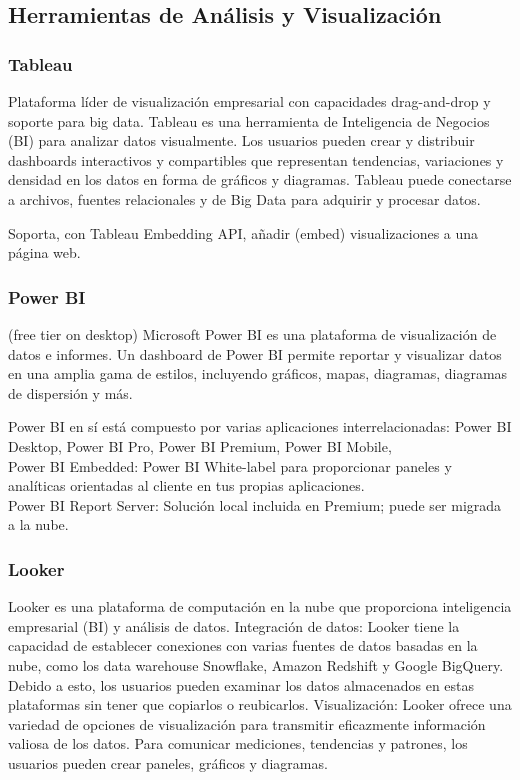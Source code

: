 \documentclass[12pt]{book}
\begin{document}
\subsection{Herramientas de Análisis y Visualización}

\subsubsection{Tableau}
Plataforma líder de visualización empresarial con capacidades drag-and-drop y soporte para big data.
Tableau es una herramienta de Inteligencia de Negocios (BI) para analizar datos visualmente. Los usuarios 
pueden crear y distribuir dashboards interactivos y compartibles que representan tendencias, 
variaciones y densidad en los datos en forma de gráficos y diagramas. Tableau puede conectarse a 
archivos, fuentes relacionales y de Big Data para adquirir y procesar datos.

Soporta, con Tableau Embedding API, añadir (embed) visualizaciones a una página web.


\subsubsection{Power BI} (free tier on desktop)
Microsoft Power BI es una plataforma de visualización de datos e informes. Un dashboard de Power BI permite reportar y visualizar 
datos en una amplia gama de estilos, incluyendo gráficos, mapas, diagramas, diagramas de dispersión y más.

Power BI en sí está compuesto por varias aplicaciones interrelacionadas: Power BI Desktop, Power BI Pro, Power BI Premium, Power BI Mobile,\\
Power BI Embedded: Power BI White-label para proporcionar paneles y analíticas orientadas al cliente en tus propias aplicaciones.\\
Power BI Report Server: Solución local incluida en Premium; puede ser migrada a la nube.\\

\subsubsection{Looker}
Looker es una plataforma de computación en la nube que proporciona inteligencia empresarial (BI) y análisis de datos.
Integración de datos: Looker tiene la capacidad de establecer conexiones con varias fuentes de datos basadas en la nube, como los data warehouse Snowflake, Amazon Redshift y Google BigQuery. Debido a esto, los usuarios pueden examinar los datos almacenados en estas plataformas sin tener que copiarlos o reubicarlos.
Visualización: Looker ofrece una variedad de opciones de visualización para transmitir eficazmente información valiosa de los datos. Para comunicar mediciones, tendencias y patrones, los usuarios pueden crear paneles, gráficos y diagramas.
\end{document}
